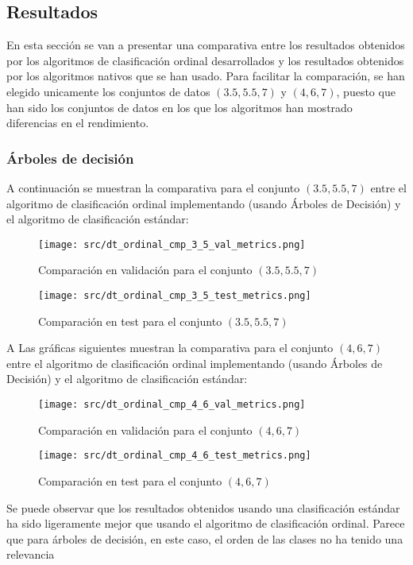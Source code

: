 \subsection{Resultados}
En esta sección se van a presentar una comparativa entre los resultados obtenidos por los algoritmos de clasificación ordinal desarrollados y los resultados obtenidos por los algoritmos nativos que se han usado. Para facilitar la comparación, se han elegido unicamente los conjuntos de datos $(3.5,5.5,7)$  y $(4,6,7)$, puesto que han sido los conjuntos de datos en los que los algoritmos han mostrado diferencias en el rendimiento.

\subsubsection*{Árboles de decisión}
\label{sec:ord_cmp_dt}
A continuación se muestran la comparativa para el conjunto $(3.5,5.5,7)$ entre el algoritmo de clasificación ordinal implementando  (usando Árboles de Decisión) y el algoritmo de clasificación estándar:
\begin{figure}[H]
    \centering
    \texttt{[image: src/dt\_ordinal\_cmp\_3\_5\_val\_metrics.png]}
    \caption{Comparación en validación para el conjunto  $(3.5,5.5,7)$ }
    \label{fig:dt_ordin_val_cmp_1}
\end{figure}
\begin{figure}[H]
    \centering
    \texttt{[image: src/dt\_ordinal\_cmp\_3\_5\_test\_metrics.png]}
    \caption{Comparación en test para el conjunto  $(3.5,5.5,7)$}
    \label{fig:dt_ordint_test_cmp_1}
\end{figure}
A
Las gráficas siguientes muestran la comparativa para el conjunto $(4,6,7)$ entre el algoritmo de clasificación ordinal implementando  (usando Árboles de Decisión) y el algoritmo de clasificación estándar:
\begin{figure}[H]
    \centering
    \texttt{[image: src/dt\_ordinal\_cmp\_4\_6\_val\_metrics.png]}
    \caption{Comparación en validación para el conjunto $(4,6,7)$}
    \label{fig:dt_ordin_val_cmp_2}
\end{figure}
\begin{figure}[H]
    \centering
    \texttt{[image: src/dt\_ordinal\_cmp\_4\_6\_test\_metrics.png]}
    \caption{Comparación en test para el conjunto  $(4,6,7)$}
    \label{fig:dt_ordint_test_cmp_2}
\end{figure}

Se puede observar que los resultados obtenidos usando una clasificación estándar ha sido ligeramente mejor que usando el algoritmo de clasificación ordinal. Parece que para árboles de decisión, en este caso, el orden de las clases no ha tenido una relevancia
